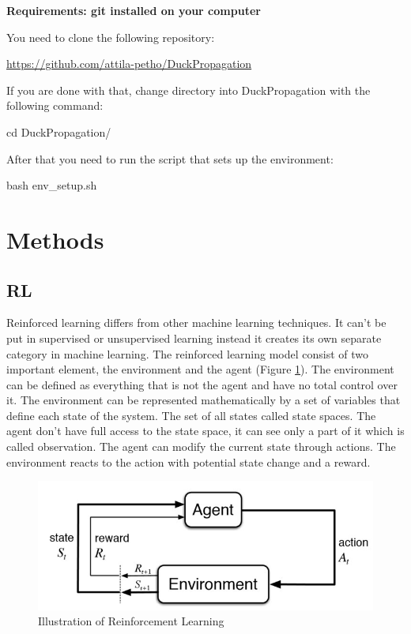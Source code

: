\documentclass{article}
\begin{document}
\textbf{Requirements: git installed on your computer}

You need to clone the following repository:\\
\begin{center}
  \url{https://github.com/attila-petho/DuckPropagation}
\end{center}

If you are done with that, change directory into DuckPropagation with the following command:
\begin{center}
	cd DuckPropagation/
\end{center}
After that you need to run the script that sets up the environment:
\begin{center}
	bash env\_setup.sh
\end{center}

\section{\large{Methods}}

\subsection{\normalsize{RL}}

Reinforced learning differs from other machine learning techniques. It can't be put in supervised or unsupervised learning instead it creates its own separate category in machine learning. The reinforced learning model consist of two important element, the environment and the agent (Figure \ref{fig:statemachin}). The environment can be defined as everything that is not the agent and have no total control over it. The environment can be represented mathematically by a set of variables that define each state of the system. The set of all states called state spaces. The agent don't have full access to the state space, it can see only a part of it which is called observation. The agent can modify the current state through actions. The environment reacts to the action with potential state change and a reward.


\begin{figure}[h!]
	\centering
	\includegraphics[width=0.8\linewidth]{rl.jpg}
	\caption{Illustration of Reinforcement Learning}
	\label{fig:statemachin}
\end{figure}
\end{document}
